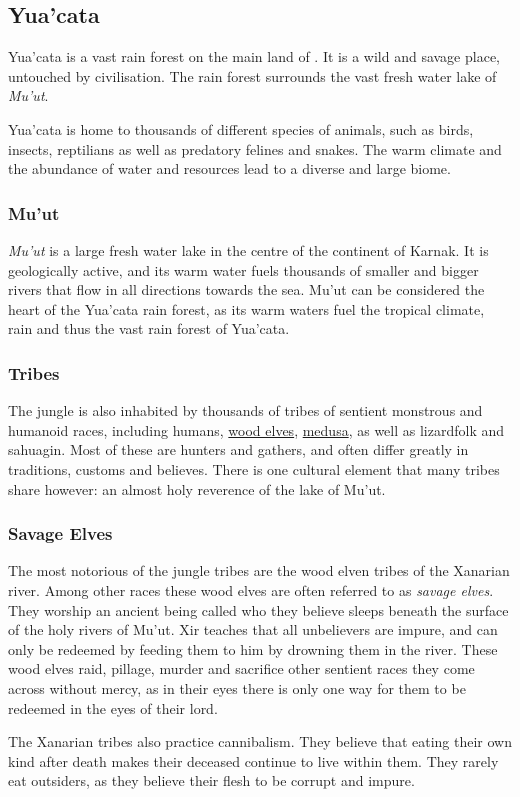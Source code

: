 \subsection{Yua'cata}
\label{sec:Yuacata}

Yua'cata is a vast rain forest on the main land of . It is a
wild and savage place, untouched by civilisation. The rain forest surrounds the
vast fresh water lake of \emph{Mu'ut}.

Yua'cata is home to thousands of different species of animals, such as birds,
insects, reptilians as well as predatory felines and snakes. The warm climate
and the abundance of water and resources lead to a diverse and large biome.

\subsubsection{Mu'ut}
\label{sec:Muut}

\emph{Mu'ut} is a large fresh water lake in the centre of the continent of
Karnak. It is geologically active, and its warm water fuels thousands of
smaller and bigger rivers that flow in all directions towards the sea. Mu'ut
can be considered the heart of the Yua'cata rain forest, as its warm waters
fuel the tropical climate, rain and thus the vast rain forest of Yua'cata.

\subsubsection{Tribes}

The jungle is also inhabited by thousands of tribes of sentient monstrous and
humanoid races, including humans, \hyperref[sec:Wood Elves]{wood elves},
\hyperref[sec:Medusa]{medusa}, as well as lizardfolk and sahuagin. Most of
these are hunters and gathers, and often differ greatly in traditions, customs
and believes. There is one cultural element that many tribes share however: an
almost holy reverence of the lake of Mu'ut.

\subsubsection{Savage Elves}
\label{sec:Savage Elves}

The most notorious of the jungle tribes are the wood elven tribes of the
Xanarian river. Among other races these wood elves are often referred to as
\emph{savage elves}. They worship an ancient being called 
who they believe sleeps beneath the surface of the holy rivers of Mu'ut. Xir
teaches that all unbelievers are impure, and can only be redeemed by feeding
them to him by drowning them in the river. These wood elves raid, pillage,
murder and sacrifice other sentient races they come across without mercy, as
in their eyes there is only one way for them to be redeemed in the eyes of
their lord.

The Xanarian tribes also practice cannibalism. They believe that eating their
own kind after death makes their deceased continue to live within them. They
rarely eat outsiders, as they believe their flesh to be corrupt and impure.
